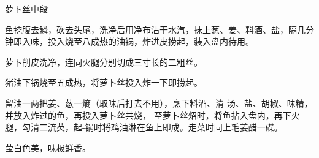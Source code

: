 \begin{recipe}[银丝中段]{萝卜丝中段}

\ingredients




\cooking

\step 鱼挖腹去鱗，砍去头尾，洗净后用净布沾干水汽，抹上葱、姜、料酒、盐，隔几分钟即入味，投入烧至八成热的油锅，炸进皮捞起，装入盘内待用。

\step 萝卜削皮洗净，连同火腿分别切成三寸长的二粗丝。

\step 猪油下锅烧至五成热，将萝卜丝投入炸一下即捞起。

留油一两把姜、葱一熵（取味后打去不用），烹下料酒、清 汤、盐、胡椒、味精，并放入炸过的鱼，再投入萝卜丝共烧， 至萝卜丝炤时，将鱼拈入盘内，再下火腿，勾清二流芡，起-锅时将鸡油淋在鱼上即成。走菜时同上毛姜醋一碟。

\notes

莹白色美，味极鲜香。

\end{recipe}

